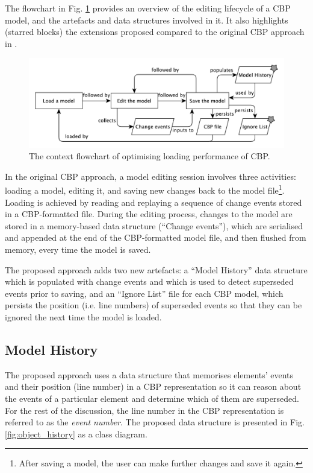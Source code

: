\documentclass[12pt, a4paper]{report} \usepackage[titletoc]{appendix}
\begin{document}
The flowchart in Fig. \ref{fig:flowchart} provides an overview of the editing lifecycle of a CBP model, and the artefacts and data structures involved in it. It also highlights (starred blocks) the extensions proposed compared to the original CBP approach in \cite{yohannis2017turning}.

\begin{figure}[ht]
    \centering
    \includegraphics[width=\linewidth]{flowchart}
    \caption{The context flowchart of optimising loading performance of CBP.}
    \label{fig:flowchart}
\end{figure}

In the original CBP approach, a model editing session involves three activities: loading a model, editing it, and saving new changes back to the model file\footnote{After saving a model, the user can make further changes and save it again.}. Loading is achieved by reading and replaying a sequence of change events stored in a CBP-formatted file. During the editing process, changes to the model are stored in a memory-based data structure (``Change events''), which are serialised and appended at the end of the CBP-formatted model file, and then flushed from memory, every time the model is saved.

The proposed approach adds two new artefacts: a ``Model History'' data structure which is populated with change events and which is used to detect superseded events prior to saving, and an ``Ignore List'' file for each CBP model, which persists the position (i.e. line numbers) of superseded events so that they can be ignored the next time the model is loaded.

\subsection{Model History}
\label{subsec:model_history}
The proposed approach uses a data structure that memorises elements' events and their position (line number) in a CBP representation so it can reason about the events of a particular element and determine which of them are superseded. For the rest of the discussion, the line number in the CBP representation is referred to as the \emph{event number}. The proposed data structure is presented in Fig. \ref{fig:object_history} as a class diagram.  
\end{document}
